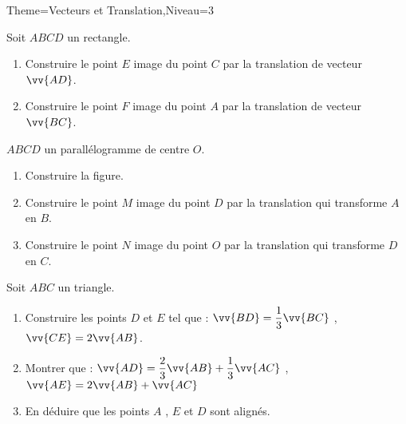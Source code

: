 \documentclass[a4paper,12pt]{article}
\begin{document}
\begin{Maquette}[Fiche]{Theme=Vecteurs et Translation,Niveau=3}
\begin{exercice}
Soit $ABCD$ un rectangle.
\begin{enumerate}
\item Construire le point $E$ image du point $C$ par la translation de vecteur $\vv{AD}$.
\item Construire le point $F$ image du point $A$ par la translation de vecteur $\vv{BC}$.
\end{enumerate}
\end{exercice}

\begin{exercice}
$ABCD$ un parallélogramme de centre $O$.
\begin{enumerate}
\item Construire la figure.
\item Construire le point $M$ image  du point $D$ par la translation qui transforme $A$ en $B$.
\item Construire le point $N$ image du point $O$ par la translation qui transforme $D$ en $C$.
\end{enumerate}
\end{exercice}

\begin{exercice}
Soit $ABC$ un triangle.
\begin{enumerate}
\item Construire les points $D$ et $E$ tel que : $\vv{BD}=\dfrac{1}{3}\vv{BC}$ , $\vv{CE}=2\vv{AB}$.
\item Montrer que : $\vv{AD}=\dfrac{2}{3}\vv{AB}+\dfrac{1}{3}\vv{AC}$ , $\vv{AE}=2\vv{AB}+\vv{AC}$
\item En déduire que les points $A$ , $E$ et $D$ sont alignés.
\end{enumerate}
\end{exercice}

\end{Maquette}
\end{document}

